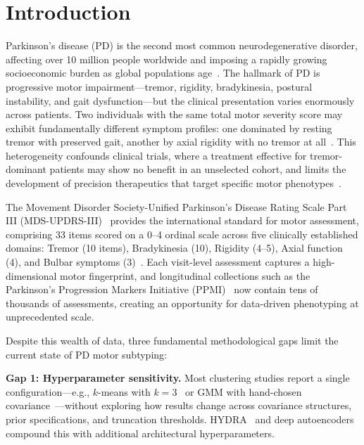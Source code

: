 \documentclass[runningheads]{llncs}
\begin{document}
\section{Introduction}

Parkinson's disease (PD) is the second most common neurodegenerative disorder, affecting over 10 million people worldwide and imposing a rapidly growing socioeconomic burden as global populations age~\cite{bloem2021parkinsons}. The hallmark of PD is progressive motor impairment---tremor, rigidity, bradykinesia, postural instability, and gait dysfunction---but the clinical presentation varies enormously across patients. Two individuals with the same total motor severity score may exhibit fundamentally different symptom profiles: one dominated by resting tremor with preserved gait, another by axial rigidity with no tremor at all~\cite{fereshtehnejad2017evolution}. This heterogeneity confounds clinical trials, where a treatment effective for tremor-dominant patients may show no benefit in an unselected cohort, and limits the development of precision therapeutics that target specific motor phenotypes~\cite{simuni2024biologicaldefinition}.

The Movement Disorder Society-Unified Parkinson's Disease Rating Scale Part III (MDS-UPDRS-III)~\cite{goetz2008mds} provides the international standard for motor assessment, comprising 33 items scored on a 0--4 ordinal scale across five clinically established domains: Tremor (10 items), Bradykinesia (10), Rigidity (4--5), Axial function (4), and Bulbar symptoms (3)~\cite{stebbins2013clinimetric}. Each visit-level assessment captures a high-dimensional motor fingerprint, and longitudinal collections such as the Parkinson's Progression Markers Initiative (PPMI)~\cite{ppmi2011} now contain tens of thousands of assessments, creating an opportunity for data-driven phenotyping at unprecedented scale.

Despite this wealth of data, three fundamental methodological gaps limit the current state of PD motor subtyping:

\textbf{Gap 1: Hyperparameter sensitivity.} Most clustering studies report a single configuration---e.g., $k$-means with $k{=}3$~\cite{fereshtehnejad2017evolution} or GMM with hand-chosen covariance~\cite{wen2023gmm}---without exploring how results change across covariance structures, prior specifications, and truncation thresholds. HYDRA~\cite{hydra2024pd} and deep autoencoders~\cite{sattar2024threepd} compound this with additional architectural hyperparameters.
\end{document}
